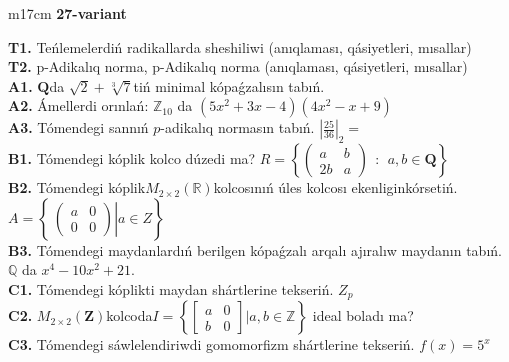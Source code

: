 \documentclass{article}
\begin{document}
\begin{tabular}{m{17cm}}
\textbf{27-variant}
\newline

\textbf{T1.} Teńlemelerdiń radikallarda sheshiliwi (anıqlaması, qásiyetleri, mısallar) \\
\textbf{T2.} p-Adikalıq norma, p-Adikalıq norma (anıqlaması, qásiyetleri, mısallar) \\
\textbf{A1.} \(\mathbf{Q}\)da \(\sqrt{2} + \sqrt[3]{7}\)tiń minimal kópaǵzalısın tabıń. \\
\textbf{A2.} Ámellerdi orınlań: \(\mathbb{Z}_{10}\) da \(\left( 5x^{2} + 3x - 4 \right)\left( 4x^{2} - x + 9 \right)\) \\
\textbf{A3.} Tómendegi sannıń \(p\)-adikalıq normasın tabıń. \(|\frac{25}{36}|_{2} =\) \\
\textbf{B1.} Tómendegi kóplik kolco dúzedi ma? \(R = \left\{ \begin{pmatrix}
a & b \\
2b & a
\end{pmatrix}\ \ :\ \ a,b \in \mathbf{Q} \right\}\) \\
\textbf{B2.} Tómendegi kóplik\(M_{2 \times 2}\left( \mathbb{R} \right)\)kolcosınıń úles kolcosı ekenliginkórsetiń. \(A = \left\{ \left. \ \begin{pmatrix}
a & 0 \\
0 & 0
\end{pmatrix} \right|a \in Z \right\}\) \\
\textbf{B3.} Tómendegi maydanlardıń berilgen kópaǵzalı arqalı ajıralıw maydanın tabıń. \(\mathbb{Q}\) da \(x^{4} - 10x^{2} + 21\). \\
\textbf{C1.} Tómendegi kóplikti maydan shártlerine tekseriń. \(Z_{p}\) \\
\textbf{C2.} \(M_{2 \times 2}\left( \mathbf{Z} \right)\)kolcoda\(I = \left\{ \begin{bmatrix}
a & 0 \\
b & 0
\end{bmatrix}|a,b\mathbb{\in Z} \right\}\) ideal boladı ma? \\
\textbf{C3.} Tómendegi sáwlelendiriwdi gomomorfizm shártlerine tekseriń. \(f(x) = 5^{x}\) \\

\end{tabular}
\vspace{1cm}
\end{document}
